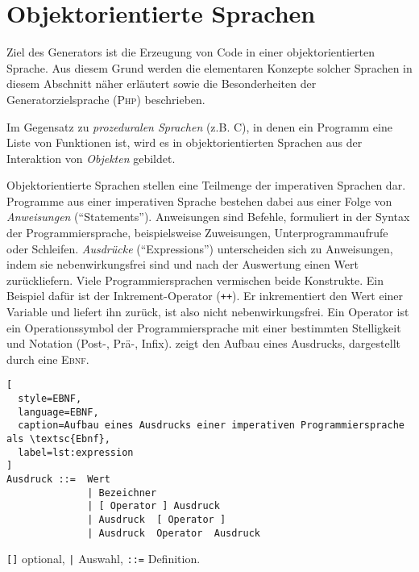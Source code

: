 \section{Objektorientierte Sprachen}
\label{sec:oo_languages}

Ziel des Generators ist die Erzeugung von Code in einer objektorientierten Sprache. Aus diesem Grund werden die elementaren Konzepte solcher Sprachen in diesem Abschnitt näher erläutert sowie die Besonderheiten der Generatorzielsprache (\textsc{Php}) beschrieben.

Im Gegensatz zu \emph{prozeduralen Sprachen} (z.B. C), in denen ein Programm eine Liste von Funktionen ist, wird es in objektorientierten Sprachen aus der Interaktion von \emph{Objekten} gebildet. 

Objektorientierte Sprachen stellen eine Teilmenge der imperativen Sprachen dar. Programme aus einer imperativen Sprache bestehen dabei aus einer Folge von \emph{Anweisungen} (\enquote{Statements}). Anweisungen sind Befehle, formuliert in der Syntax der Programmiersprache, beispielsweise Zuweisungen, Unterprogrammaufrufe oder Schleifen. \emph{Ausdrücke} (\enquote{Expressions}) unterscheiden sich zu Anweisungen, indem sie nebenwirkungsfrei sind und nach der Auswertung einen Wert zurückliefern. Viele Programmiersprachen vermischen beide Konstrukte. Ein Beispiel dafür ist der Inkrement-Operator (\texttt{++}). Er inkrementiert den Wert einer Variable und liefert ihn zurück, ist also nicht nebenwirkungsfrei.
Ein Operator ist ein Operationssymbol der Programmiersprache mit einer bestimmten Stelligkeit und Notation (Post-, Prä-, Infix).
 zeigt den Aufbau eines Ausdrucks, dargestellt durch eine \textsc{Ebnf}.

\begin{minipage}{\textwidth}
\begin{lstlisting}[
  style=EBNF, 
  language=EBNF,
  caption=Aufbau eines Ausdrucks einer imperativen Programmiersprache als \textsc{Ebnf},
  label=lst:expression
]
Ausdruck ::=  Wert 
              | Bezeichner
              | [ Operator ] Ausdruck
              | Ausdruck  [ Operator ]
              | Ausdruck  Operator  Ausdruck
\end{lstlisting}
\end{minipage}
\vspace{-\baselineskip}
{\footnotesize \begin{center} \texttt{[]} optional, \texttt{|} Auswahl, \texttt{::=} Definition. \end{center}}

